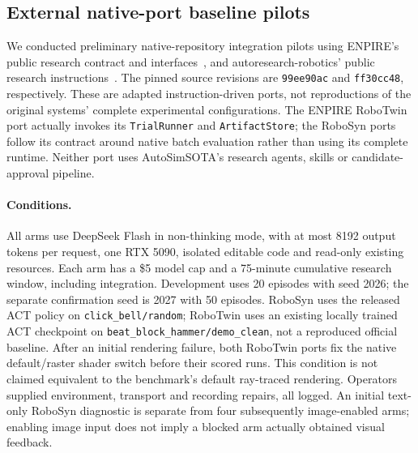 \documentclass[10pt,twocolumn,letterpaper]{article}
\begin{document}
\subsection{External native-port baseline pilots}
We conducted preliminary native-repository integration pilots using ENPIRE's
public research contract and interfaces~\cite{enpire}, and
autoresearch-robotics' public research instructions~\cite{autoresearchrobotics}.
The pinned source revisions are \texttt{99ee90ac} and \texttt{ff30cc48},
respectively. These are adapted instruction-driven ports, not reproductions of
the original systems' complete experimental configurations. The ENPIRE RoboTwin
port actually invokes its \texttt{TrialRunner} and \texttt{ArtifactStore}; the
RoboSyn ports follow its contract around native batch evaluation rather than
using its complete runtime. Neither port uses AutoSimSOTA's research agents,
skills or candidate-approval pipeline.

\paragraph{Conditions.}
All arms use DeepSeek Flash in non-thinking mode, with at most 8192 output tokens
per request, one RTX 5090, isolated editable code and read-only existing resources.
Each arm has a \$5 model cap and a 75-minute cumulative research window, including
integration. Development uses 20 episodes with seed 2026; the separate confirmation
seed is 2027 with 50 episodes. RoboSyn uses the released ACT policy on
\texttt{click\_bell/random}; RoboTwin uses an existing locally trained ACT
checkpoint on \texttt{beat\_block\_hammer/demo\_clean}, not a reproduced official
baseline. After an initial rendering failure, both RoboTwin ports fix the native
default/raster shader switch before their scored runs. This condition is not
claimed equivalent to the benchmark's default ray-traced rendering.
Operators supplied environment, transport and recording repairs, all logged.
An initial text-only RoboSyn diagnostic is separate from four subsequently
image-enabled arms; enabling image input does not imply a blocked arm actually
obtained visual feedback.
\end{document}
